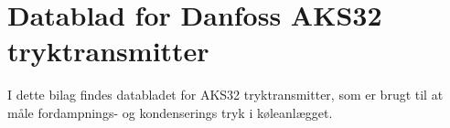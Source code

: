 \documentclass[Hovedrapport.tex]{subfiles}
\begin{document}
\newpage
\section{Datablad for Danfoss AKS32 tryktransmitter}
\label{sec:bil_tryk}
I dette bilag findes databladet for AKS32 tryktransmitter, som er brugt til at måle fordampnings- og kondenserings tryk i køleanlægget. 

\begin{minipage}{1.0\textwidth}

\end{minipage}






\clearpage
\end{document}
